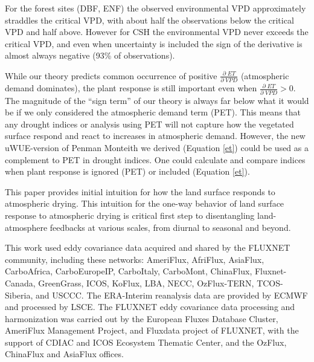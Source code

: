 \documentclass[draft,linenumbers]{agujournal}
\begin{document}
For the forest sites (DBF, ENF) the observed environmental VPD approximately straddles the critical VPD, with about half the observations below the critical VPD and half above. However for CSH the environmental VPD never exceeds the critical VPD, and even when uncertainty is included the sign of the derivative is almost always negative (93\% of observations).

While our theory predicts common occurrence of positive $\frac{\partial \; ET}{\partial \; VPD}$ (atmospheric demand dominates), the plant response is still important even when $\frac{\partial \; ET}{\partial \; VPD} > 0$. The magnitude of the ``sign term'' of our theory is always far below what it would be if we only considered the atmospheric demand term (PET). This means that any drought indices or analysis using PET will not capture how the vegetated surface respond and react to increases in atmospheric demand. However, the new uWUE-version of Penman Monteith we derived (Equation \ref{et}) could be used as a complement to PET in drought indices. One could calculate and compare indices  when plant response is ignored (PET) or included (Equation \ref{et}). 

This paper provides initial intuition for how the land surface responds to atmospheric drying. This intuition for the one-way behavior of  land surface response to atmospheric drying is critical first step to disentangling land-atmosphere feedbacks at various scales, from diurnal to seasonal and beyond. 


\acknowledgments
This work used eddy covariance data acquired and shared by the FLUXNET community, including these networks: AmeriFlux, AfriFlux, AsiaFlux, CarboAfrica, CarboEuropeIP, CarboItaly, CarboMont, ChinaFlux, Fluxnet-Canada, GreenGrass, ICOS, KoFlux, LBA, NECC, OzFlux-TERN, TCOS-Siberia, and USCCC. The ERA-Interim reanalysis data are provided by ECMWF and processed by LSCE. The FLUXNET eddy covariance data processing and harmonization was carried out by the European Fluxes Database Cluster, AmeriFlux Management Project, and Fluxdata project of FLUXNET, with the support of CDIAC and ICOS Ecosystem Thematic Center, and the OzFlux, ChinaFlux and AsiaFlux offices.

%


\listofchanges
\end{document}
